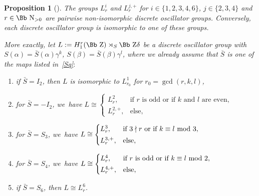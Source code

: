 \documentclass[10pt,a4paper]{amsart}
\newcommand\NN{{\mbox{\Bb N}}}
\newcommand\ZZ{{\mbox{\Bb Z}}}
\newcommand{\benur}{\begin{enumerate}[label=$(\roman*)$]\itemsep=0pt}
\numberwithin{equation}{section}
\newtheorem{Proposition}[Theorem]{Proposition}
 { \theoremstyle{definition}
\newtheorem{Definition}[Theorem]{Definition}
\newtheorem{Note}[Theorem]{Note}
\newtheorem{Example}[Theorem]{Example}
\newtheorem{Remark}[Theorem]{Remark} }
\begin{document}
\begin{Proposition}[\cite{F}]\label{TF}
The groups $L^i_r$ and $L^{j,+}_r$ for $i\in\{1,2,3,4,6\}$, $j\in\{2,3,4\}$ and $r\in\NN_{>0}$ are pairwise non-isomorphic discrete oscillator groups.
Conversely, each discrete oscillator group is isomorphic to one of these groups.

More exactly, let $L:=H_1^r(\ZZ)\rtimes_S \ZZ \delta$ be a discrete oscillator group with $S(\alpha)=\bar S(\alpha)\gamma^k$, $S(\beta)=\bar S(\beta)\gamma^l$, where we already assume that $\bar S$ is one of the maps listed in~\eqref{Sq}$:$
\benur
\item if $\bar S=I_2$, then $L$ is isomorphic to $L^1_{r_0}$ for $r_0=\gcd(r,k,l)$,
\item for $\bar S=-I_2$, we~have
$L\cong \begin{cases}
L^2_r, & \text{if $r$ is odd or if $k$ and $l$ are even},
\\[0.5ex]
L^{2,+}_r, & \text{else},
\end{cases}$
\item for $\bar S=S_3$, we~have
$L\cong \begin{cases} L^3_r, & \text{if $3\nmid r$ or if $k\equiv l\ {\rm mod}\ 3$},
\\[0.5ex]
L^{3,+}_r, & \text{else},
\end{cases}$
\item for $\bar S=S_4$, we~have
$L\cong \begin{cases} L^4_r, & \text{if $r$ is odd or if $k\equiv l\ {\rm mod}\ 2$},
\\[0.5ex]
L^{4,+}_r, & \text{else},
\end{cases}$
\item if $\bar S=S_6$, then $L\cong L^6_{r}$.
\end{enumerate}
\end{Proposition}
\end{document}
